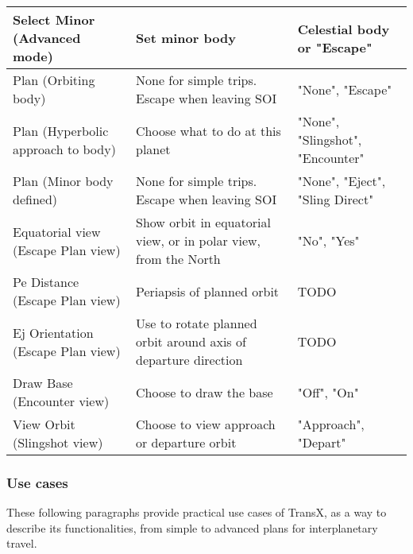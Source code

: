 \documentclass[Orbiter User Manual.tex]{subfiles}
\begin{document}
\begin{longtable}{ |p{}|p{}|p{}| }
	\hline\rule{0pt}{2ex}
	Select Minor (Advanced mode) & Set minor body & Celestial body or "Escape"\\
	\hline\rule{0pt}{2ex}
	Plan (Orbiting body) & None for simple trips. Escape when leaving SOI & "None", "Escape"\\
	\hline\rule{0pt}{2ex}
	Plan (Hyperbolic approach to body) & Choose what to do at this planet & "None", "Slingshot", "Encounter"\\
	\hline\rule{0pt}{2ex}
	Plan (Minor body defined) & None for simple trips. Escape when leaving SOI & "None", "Eject", "Sling Direct"\\
	\hline\rule{0pt}{2ex}
	Equatorial view (Escape Plan view) & Show orbit in equatorial view, or in polar view, from the North & "No", "Yes"\\
	\hline\rule{0pt}{2ex}
	Pe Distance (Escape Plan view) & Periapsis of planned orbit & TODO\\
	\hline\rule{0pt}{2ex}
	Ej Orientation (Escape Plan view) & Use to rotate planned orbit around axis of departure direction & TODO\\
	\hline\rule{0pt}{2ex}
	Draw Base (Encounter view) & Choose to draw the base & "Off", "On"\\
	\hline\rule{0pt}{2ex}
	View Orbit (Slingshot view) & Choose to view approach or departure orbit & "Approach", "Depart"\\
	\hline
	\end{longtable}


\subsubsection{Use cases}
These following paragraphs provide practical use cases of TransX, as a way to describe its functionalities, from simple to advanced plans for interplanetary travel.\\
\end{document}
